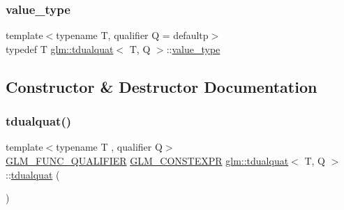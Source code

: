 \mbox{\label{structglm_1_1tdualquat_ab9028885c8de069ef8a61ebab77f7ccc}} 
\subsubsection{\texorpdfstring{value\+\_\+type}{value\_type}}
{\footnotesize\ttfamily template$<$typename T, qualifier Q = defaultp$>$ \\
typedef T \hyperlink{structglm_1_1tdualquat}{glm\+::tdualquat}$<$ T, Q $>$\+::\hyperlink{structglm_1_1tdualquat_ab9028885c8de069ef8a61ebab77f7ccc}{value\+\_\+type}}



\subsection{Constructor \& Destructor Documentation}
\mbox{\label{structglm_1_1tdualquat_ab2b5e57b73a6f79c56e9bcdc7d5e1607}} 
\subsubsection{\texorpdfstring{tdualquat()}{tdualquat()}\hspace{0.1cm}{\footnotesize\ttfamily [1/11]}}
{\footnotesize\ttfamily template$<$typename T , qualifier Q$>$ \\
\hyperlink{setup_8hpp_a33fdea6f91c5f834105f7415e2a64407}{G\+L\+M\+\_\+\+F\+U\+N\+C\+\_\+\+Q\+U\+A\+L\+I\+F\+I\+ER} \hyperlink{setup_8hpp_a08b807947b47031d3a511f03f89645ad}{G\+L\+M\+\_\+\+C\+O\+N\+S\+T\+E\+X\+PR} \hyperlink{structglm_1_1tdualquat}{glm\+::tdualquat}$<$ T, Q $>$\+::\hyperlink{structglm_1_1tdualquat}{tdualquat} (\begin{DoxyParamCaption}{ }\end{DoxyParamCaption})}

\mbox{\label{structglm_1_1tdualquat_ad6099c663113c443a9efeeabbd321bd1}} 

